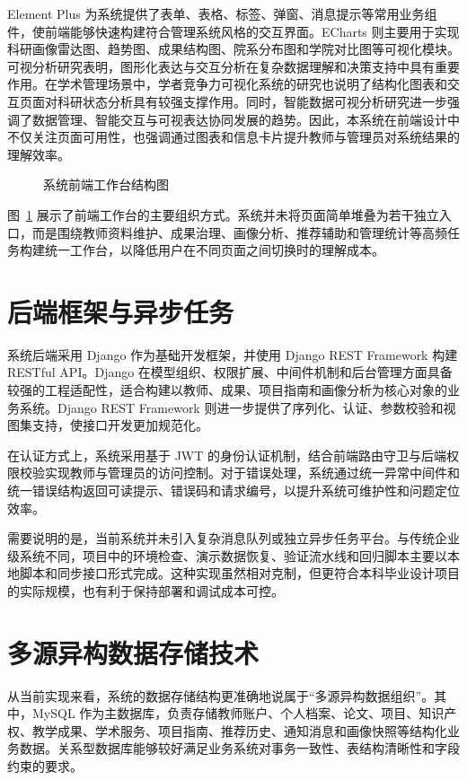 \documentclass[12pt,a4paper]{ctexbook}
\begin{document}
Element Plus 为系统提供了表单、表格、标签、弹窗、消息提示等常用业务组件，使前端能够快速构建符合管理系统风格的交互界面。ECharts 则主要用于实现科研画像雷达图、趋势图、成果结构图、院系分布图和学院对比图等可视化模块。可视分析研究表明，图形化表达与交互分析在复杂数据理解和决策支持中具有重要作用\cite{visual_analytics_2008}。在学术管理场景中，学者竞争力可视化系统的研究也说明了结构化图表和交互页面对科研状态分析具有较强支撑作用\cite{scholar_visualization_2020}。同时，智能数据可视分析研究进一步强调了数据管理、智能交互与可视表达协同发展的趋势\cite{intelligent_visual_analytics_2024}。因此，本系统在前端设计中不仅关注页面可用性，也强调通过图表和信息卡片提升教师与管理员对系统结果的理解效率。

\begin{figure}[H]
  \centering
  
  \caption{系统前端工作台结构图}
  \label{fig:frontend-workspace}
\end{figure}

图~\ref{fig:frontend-workspace} 展示了前端工作台的主要组织方式。系统并未将页面简单堆叠为若干独立入口，而是围绕教师资料维护、成果治理、画像分析、推荐辅助和管理统计等高频任务构建统一工作台，以降低用户在不同页面之间切换时的理解成本。

\section{后端框架与异步任务}
系统后端采用 Django 作为基础开发框架，并使用 Django REST Framework 构建 RESTful API。Django 在模型组织、权限扩展、中间件机制和后台管理方面具备较强的工程适配性，适合构建以教师、成果、项目指南和画像分析为核心对象的业务系统。Django REST Framework 则进一步提供了序列化、认证、参数校验和视图集支持，使接口开发更加规范化。

在认证方式上，系统采用基于 JWT 的身份认证机制，结合前端路由守卫与后端权限校验实现教师与管理员的访问控制。对于错误处理，系统通过统一异常中间件和统一错误结构返回可读提示、错误码和请求编号，以提升系统可维护性和问题定位效率。

需要说明的是，当前系统并未引入复杂消息队列或独立异步任务平台。与传统企业级系统不同，项目中的环境检查、演示数据恢复、验证流水线和回归脚本主要以本地脚本和同步接口形式完成。这种实现虽然相对克制，但更符合本科毕业设计项目的实际规模，也有利于保持部署和调试成本可控。

\section{多源异构数据存储技术}
从当前实现来看，系统的数据存储结构更准确地说属于“多源异构数据组织”。其中，MySQL 作为主数据库，负责存储教师账户、个人档案、论文、项目、知识产权、教学成果、学术服务、项目指南、推荐历史、通知消息和画像快照等结构化业务数据。关系型数据库能够较好满足业务系统对事务一致性、表结构清晰性和字段约束的要求。
\end{document}
